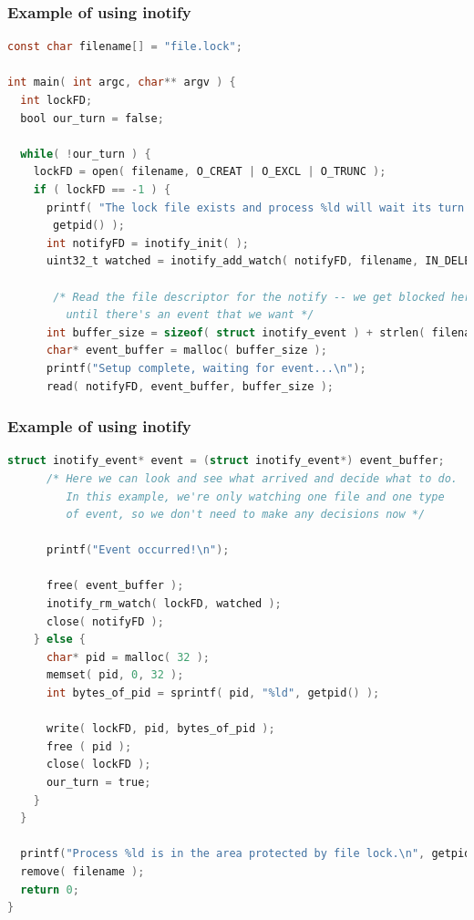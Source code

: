\begin{frame}[fragile]
\frametitle{Example of using inotify}

\begin{lstlisting}[language=C]
const char filename[] = "file.lock";

int main( int argc, char** argv ) {
  int lockFD;
  bool our_turn = false;
  
  while( !our_turn ) {
    lockFD = open( filename, O_CREAT | O_EXCL | O_TRUNC );
    if ( lockFD == -1 ) {
      printf( "The lock file exists and process %ld will wait its turn...\n",
       getpid() ); 
      int notifyFD = inotify_init( );
      uint32_t watched = inotify_add_watch( notifyFD, filename, IN_DELETE_SELF );
      
       /* Read the file descriptor for the notify -- we get blocked here
         until there's an event that we want */
      int buffer_size = sizeof( struct inotify_event ) + strlen( filename ) + 1;
      char* event_buffer = malloc( buffer_size );
      printf("Setup complete, waiting for event...\n");
      read( notifyFD, event_buffer, buffer_size );

\end{lstlisting}
\end{frame}


 \begin{frame}[fragile]
\frametitle{Example of using inotify}

\begin{lstlisting}[language=C]     
      struct inotify_event* event = (struct inotify_event*) event_buffer;
      /* Here we can look and see what arrived and decide what to do.
         In this example, we're only watching one file and one type
         of event, so we don't need to make any decisions now */

      printf("Event occurred!\n");

      free( event_buffer );
      inotify_rm_watch( lockFD, watched );
      close( notifyFD );
    } else {
      char* pid = malloc( 32 );
      memset( pid, 0, 32 );
      int bytes_of_pid = sprintf( pid, "%ld", getpid() );

      write( lockFD, pid, bytes_of_pid ); 
      free ( pid );
      close( lockFD );
      our_turn = true; 
    }
  } 

  printf("Process %ld is in the area protected by file lock.\n", getpid());
  remove( filename );
  return 0;
}
\end{lstlisting}

\end{frame}

